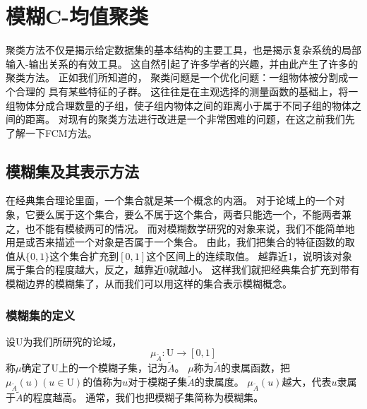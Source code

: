 \chapter[模糊C-均值聚类]{模糊C-均值聚类}
聚类方法不仅是揭示给定数据集的基本结构的主要工具，也是揭示复杂系统的局部输入-输出关系的有效工具。
这自然引起了许多学者的兴趣，并由此产生了许多的聚类方法。
正如我们所知道的， 聚类问题是一个优化问题：一组物体被分割成一个合理的 具有某些特征的子群。
这往往是在主观选择的测量函数的基础上，将一组物体分成合理数量的子组，使子组内物体之间的距离小于属于不同子组的物体之间的距离。
对现有的聚类方法进行改进是一个非常困难的问题，在这之前我们先了解一下FCM方法。
\section{模糊集及其表示方法}
\par
在经典集合理论里面，一个集合就是某一个概念的内涵。
对于论域上的一个对象，它要么属于这个集合，要么不属于这个集合，两者只能选一个，不能两者兼之，也不能有模棱两可的情况。
而对模糊数学研究的对象来说，我们不能简单地用是或否来描述一个对象是否属于一个集合。
由此，我们把集合的特征函数的取值从$\{0,1\}$这个集合扩充到$[0,1]$这个区间上的连续取值。
越靠近1，说明该对象属于集合的程度越大，反之，越靠近0就越小。
这样我们就把经典集合扩充到带有模糊边界的模糊集了，从而我们可以用这样的集合表示模糊概念。
\subsection{模糊集的定义}
\begin{definition}
    设$\mathrm{U}$为我们所研究的论域，
    \[
        \mu_{\tilde{A}}: \mathrm{U} \longrightarrow[0,1]
    \]
    称$\mu$确定了$\mathrm{U}$上的一个模糊子集，记为$\tilde{A}$。
    $\mu$称为$\tilde{A}$的隶属函数，把$\mu_{\tilde{A}}(u)(u \in \mathrm{U})$的值称为$u$对于模糊子集$\tilde{A}$的隶属度。
    $\mu_{\tilde{A}}(u)$越大，代表$u$隶属于$\tilde{A}$的程度越高。
    通常，我们也把模糊子集简称为模糊集。
\end{definition}

